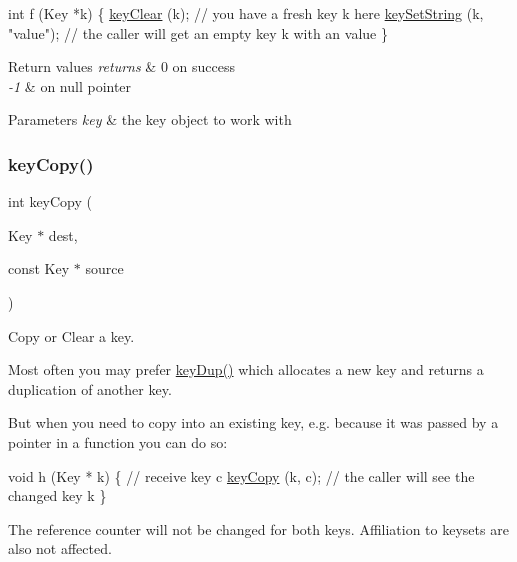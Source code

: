 \begin{DoxyCode}
\textcolor{keywordtype}{int} f (Key *k)
\{
        \hyperlink{group__key_gab2242311a36bbc0520e0d36895107ec1}{keyClear} (k);
        \textcolor{comment}{// you have a fresh key k here}
        \hyperlink{group__keyvalue_ga622bde1eb0e0c4994728331326340ef2}{keySetString} (k, \textcolor{stringliteral}{"value"});
        \textcolor{comment}{// the caller will get an empty key k with an value}
\}
\end{DoxyCode}



\begin{DoxyRetVals}{Return values}
{\em returns} & 0 on success \\
\hline
{\em -\/1} & on null pointer\\
\hline
\end{DoxyRetVals}

\begin{DoxyParams}{Parameters}
{\em key} & the key object to work with \\
\hline
\end{DoxyParams}
\mbox{\label{group__key_ga6a12cbbe656a1ad9f41b8c681d7a2f92}} 
\subsubsection{\texorpdfstring{key\+Copy()}{keyCopy()}}
{\footnotesize\ttfamily int key\+Copy (\begin{DoxyParamCaption}\item[{Key $\ast$}]{dest,  }\item[{const Key $\ast$}]{source }\end{DoxyParamCaption})}



Copy or Clear a key. 

Most often you may prefer \hyperlink{group__key_gae6ec6a60cc4b8c1463fa08623d056ce3}{key\+Dup()} which allocates a new key and returns a duplication of another key.

But when you need to copy into an existing key, e.\+g. because it was passed by a pointer in a function you can do so\+:


\begin{DoxyCodeInclude}
\textcolor{keywordtype}{void} h (Key * k)
\{
        \textcolor{comment}{// receive key c}
        \hyperlink{group__key_ga6a12cbbe656a1ad9f41b8c681d7a2f92}{keyCopy} (k, c);
        \textcolor{comment}{// the caller will see the changed key k}
\}
\end{DoxyCodeInclude}
 The reference counter will not be changed for both keys. Affiliation to keysets are also not affected.

